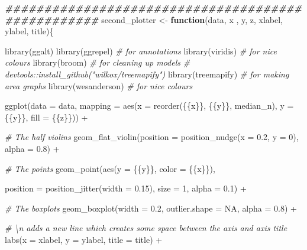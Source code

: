 \documentclass[a4paper,nobind]{templates/ociamthesis}
\newenvironment{Shaded}{\begin{snugshade}}{\end{snugshade}}
\newcommand{\AttributeTok}[1]{\textcolor[rgb]{0.77,0.63,0.00}{#1}}
\newcommand{\CommentTok}[1]{\textcolor[rgb]{0.56,0.35,0.01}{\textit{#1}}}
\newcommand{\ConstantTok}[1]{\textcolor[rgb]{0.00,0.00,0.00}{#1}}
\newcommand{\ControlFlowTok}[1]{\textcolor[rgb]{0.13,0.29,0.53}{\textbf{#1}}}
\newcommand{\DecValTok}[1]{\textcolor[rgb]{0.00,0.00,0.81}{#1}}
\newcommand{\DocumentationTok}[1]{\textcolor[rgb]{0.56,0.35,0.01}{\textbf{\textit{#1}}}}
\newcommand{\FloatTok}[1]{\textcolor[rgb]{0.00,0.00,0.81}{#1}}
\newcommand{\FunctionTok}[1]{\textcolor[rgb]{0.00,0.00,0.00}{#1}}
\newcommand{\NormalTok}[1]{#1}
\newcommand{\OtherTok}[1]{\textcolor[rgb]{0.56,0.35,0.01}{#1}}
\newcommand{\SpecialCharTok}[1]{\textcolor[rgb]{0.00,0.00,0.00}{#1}}
\renewenvironment{Shaded}
{
  \vspace{10pt}%
  \begin{snugshade}%
}{%
  \end{snugshade}%
  \vspace{8pt}%
}
\begin{document}
\begin{Shaded}
\begin{Highlighting}[]
\DocumentationTok{\#\#\#\#\#\#\#\#\#\#\#\#\#\#\#\#\#\#\#\#\#\#\#\#\#\#\#\#\#\#\#\#\#\#\#\#\#\#\#\#\#\#\#\#\#\#\#\#\#\#}
\NormalTok{second\_plotter }\OtherTok{\textless{}{-}} \ControlFlowTok{function}\NormalTok{(data, x , y, z, xlabel, ylabel, title)\{}

\FunctionTok{library}\NormalTok{(ggalt)  }
\FunctionTok{library}\NormalTok{(ggrepel)  }\CommentTok{\# for annotations}
\FunctionTok{library}\NormalTok{(viridis)  }\CommentTok{\# for nice colours}
\FunctionTok{library}\NormalTok{(broom)  }\CommentTok{\# for cleaning up models}
\CommentTok{\# devtools::install\_github("wilkox/treemapify")}
\FunctionTok{library}\NormalTok{(treemapify)  }\CommentTok{\# for making area graphs}
\FunctionTok{library}\NormalTok{(wesanderson)  }\CommentTok{\# for nice colours}

  \FunctionTok{ggplot}\NormalTok{(}\AttributeTok{data =}\NormalTok{ data, }
           \AttributeTok{mapping =} \FunctionTok{aes}\NormalTok{(}\AttributeTok{x =} \FunctionTok{reorder}\NormalTok{(\{\{x\}\}, \{\{y\}\}, median\_n), }\AttributeTok{y =}\NormalTok{ \{\{y\}\}, }\AttributeTok{fill =}\NormalTok{ \{\{z\}\})) }\SpecialCharTok{+}
    
    \CommentTok{\# The half violins}
    \FunctionTok{geom\_flat\_violin}\NormalTok{(}\AttributeTok{position =} \FunctionTok{position\_nudge}\NormalTok{(}\AttributeTok{x =} \FloatTok{0.2}\NormalTok{, }\AttributeTok{y =} \DecValTok{0}\NormalTok{), }\AttributeTok{alpha =} \FloatTok{0.8}\NormalTok{) }\SpecialCharTok{+}
    
    \CommentTok{\# The points}
    \FunctionTok{geom\_point}\NormalTok{(}\FunctionTok{aes}\NormalTok{(}\AttributeTok{y =}\NormalTok{ \{\{y\}\}, }\AttributeTok{color =}\NormalTok{ \{\{x\}\}), }
    
    \AttributeTok{position =} \FunctionTok{position\_jitter}\NormalTok{(}\AttributeTok{width =} \FloatTok{0.15}\NormalTok{), }\AttributeTok{size =} \DecValTok{1}\NormalTok{, }\AttributeTok{alpha =} \FloatTok{0.1}\NormalTok{) }\SpecialCharTok{+}
    
    \CommentTok{\# The boxplots}
    \FunctionTok{geom\_boxplot}\NormalTok{(}\AttributeTok{width =} \FloatTok{0.2}\NormalTok{, }\AttributeTok{outlier.shape =} \ConstantTok{NA}\NormalTok{, }\AttributeTok{alpha =} \FloatTok{0.8}\NormalTok{) }\SpecialCharTok{+}
    
    \CommentTok{\# \textbackslash{}n adds a new line which creates some space between the axis and axis title}
    \FunctionTok{labs}\NormalTok{(}\AttributeTok{x =}\NormalTok{ xlabel, }\AttributeTok{y =}\NormalTok{ ylabel, }\AttributeTok{title =}\NormalTok{ title) }\SpecialCharTok{+}
    

\end{Highlighting}
\end{Shaded}
\end{document}

